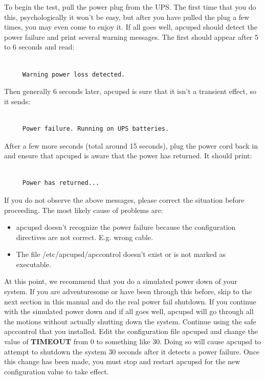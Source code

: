 {{To begin the test, pull the power plug from the UPS. The first time that you
do this, psychologically it won't be easy, but after you have pulled the plug
a few times, you may even come to enjoy it. If all goes well, apcupsd should
detect the power failure and print several warning messages. The first should
appear after 5 to 6 seconds and read: 

\footnotesize
\begin{verbatim}
     
     Warning power loss detected.
\end{verbatim}
\normalsize

Then generally 6 seconds later, apcupsd is sure that it isn't a transient
effect, so it sends: 

\footnotesize
\begin{verbatim}
     
     Power failure. Running on UPS batteries.
\end{verbatim}
\normalsize

After a few more seconds (total around 15 seconds), plug the power cord back
in and ensure that apcupsd is aware that the power has returned. It should
print: 

\footnotesize
\begin{verbatim}
     
     Power has returned...
\end{verbatim}
\normalsize

If you do not observe the above messages, please correct the situation before
proceeding. The most likely cause of problems are:  

\begin{itemize}
\item apcupsd doesn't recognize the power failure because the configuration
directives are not correct. E.g. wrong cable.  
\item The file /etc/apcupsd/apccontrol doesn't exist or is not marked as
executable. 
\end{itemize}

At this point, we recommend that you do a simulated power down of your system.
If you are adventuresome or have been through this before, skip to the next
section in this manual and do the real power fail shutdown. If you continue
with the simulated power down and if all goes well, apcupsd will go through
all the motions without actually shutting down the system. Continue using the
safe apccontrol that you installed. Edit the configuration file apcupsd and
change the value of {\bf TIMEOUT} from 0 to something like 30. Doing so will
cause apcupsd to attempt to shutdown the system 30 seconds after it detects a
power failure. Once this change has been made, you must stop and restart
apcupsd for the new configuration value to take effect.  

}}
